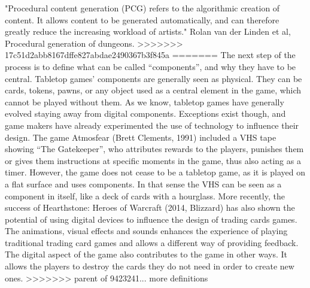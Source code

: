 "Procedural content generation (PCG) refers to the algorithmic creation of content. It allows content to be generated automatically, and can therefore greatly reduce the increasing workload of artists." Rolan van der Linden et al, Procedural generation of dungeons.
>>>>>>> 17c51d2abb8167dffe827abdae2490367b3f845a
=======
The next step of the process is to define what can be called “components”, and why they have to be central. Tabletop games’ components are generally seen as physical. They can be cards, tokens, pawns, or any object used as a central element in the game, which cannot be played without them.  As we know, tabletop games have generally evolved staying away from digital components. Exceptions exist though, and game makers have already experimented the use of technology to influence their design. The game Atmosfear (Brett Clements, 1991) included a VHS tape showing “The Gatekeeper”, who attributes rewards to the players, punishes them or gives them instructions at specific moments in the game, thus also acting as a timer. However, the game does not cease to be a tabletop game, as it is played on a flat surface and uses components. In that sense the VHS can be seen as a component in itself, like a deck of cards with a hourglass. 
More recently, the success of Hearthstone: Heroes of Warcraft (2014, Blizzard) has also shown the potential of using digital devices to influence the design of trading cards games. The animations, visual effects and sounds enhances the experience of playing traditional trading card games and allows a different way of providing feedback. The digital aspect of the game also contributes to the game in other ways. It allows the players to destroy the cards they do not need in order to create new ones.
>>>>>>> parent of 9423241... more definitions

